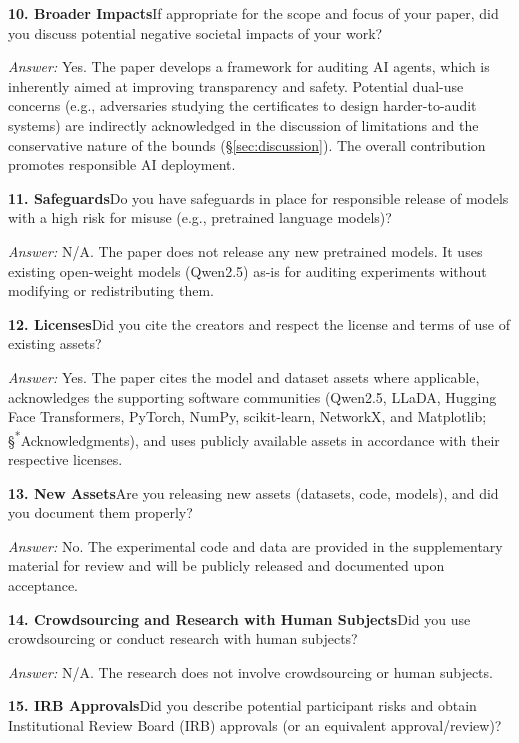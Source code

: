 \documentclass{article}
\begin{document}
  \noindent\textbf{10. Broader Impacts}\quad If appropriate for the scope and
  focus of your paper, did you discuss potential negative societal impacts of
  your work?

  \emph{Answer:} Yes. The paper develops a framework for auditing AI agents,
  which is inherently aimed at improving transparency and safety. Potential
  dual-use concerns (e.g., adversaries studying the certificates to design
  harder-to-audit systems) are indirectly acknowledged in the discussion of
  limitations and the conservative nature of the bounds
  (\S\ref{sec:discussion}). The overall contribution promotes responsible AI
  deployment.

  \noindent\textbf{11. Safeguards}\quad Do you have safeguards in place for
  responsible release of models with a high risk for misuse (e.g., pretrained
  language models)?

  \emph{Answer:} N/A. The paper does not release any new pretrained models. It
  uses existing open-weight models (Qwen2.5) as-is for auditing experiments
  without modifying or redistributing them.

  \noindent\textbf{12. Licenses}\quad Did you cite the creators and respect the
  license and terms of use of existing assets?

  \emph{Answer:} Yes. The paper cites the model and dataset assets where
  applicable, acknowledges the supporting software communities (Qwen2.5, LLaDA,
  Hugging Face Transformers, PyTorch, NumPy, scikit-learn, NetworkX, and
  Matplotlib; \S\textsuperscript{*}Acknowledgments), and uses
  publicly available assets in accordance with their respective licenses.

  \noindent\textbf{13. New Assets}\quad Are you releasing new assets (datasets,
  code, models), and did you document them properly?

  \emph{Answer:} No. The experimental code and data are provided in the
  supplementary material for review and will be publicly released and documented
  upon acceptance.

  \noindent\textbf{14. Crowdsourcing and Research with Human Subjects}\quad Did
  you use crowdsourcing or conduct research with human subjects?

  \emph{Answer:} N/A. The research does not involve crowdsourcing or human
  subjects.

  \noindent\textbf{15. IRB Approvals}\quad Did you describe potential
  participant risks and obtain Institutional Review Board (IRB) approvals (or an
   equivalent approval/review)?
\end{document}
